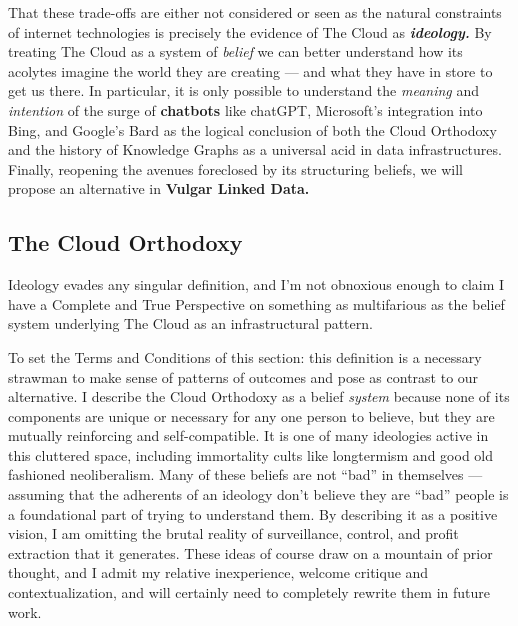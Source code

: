 That these trade-offs are either not considered or seen as the natural
constraints of internet technologies is precisely the evidence of The
Cloud as \textbf{\emph{ideology.}} By treating The Cloud as a system of
\emph{belief} we can better understand how its acolytes imagine the
world they are creating --- and what they have in store to get us there.
In particular, it is only possible to understand the \emph{meaning} and
\emph{intention} of the surge of \textbf{chatbots} like chatGPT,
Microsoft's integration into Bing, and Google's Bard as the logical
conclusion of both the Cloud Orthodoxy and the history of Knowledge
Graphs as a universal acid in data infrastructures. Finally, reopening
the avenues foreclosed by its structuring beliefs, we will propose an
alternative in \textbf{Vulgar Linked Data.}

\hypertarget{the-cloud-orthodoxy}{%
\subsection{The Cloud Orthodoxy}\label{the-cloud-orthodoxy}}

Ideology evades any singular definition, and I'm not obnoxious enough to
claim I have a Complete and True Perspective on something as
multifarious as the belief system underlying The Cloud as an
infrastructural pattern.

To set the Terms and Conditions of this section: this definition is a
necessary strawman to make sense of patterns of outcomes and pose as
contrast to our alternative. I describe the Cloud Orthodoxy as a belief
\emph{system} because none of its components are unique or necessary for
any one person to believe, but they are mutually reinforcing and
self-compatible. It is one of many ideologies active in this cluttered
space, including immortality cults like longtermism and good old
fashioned neoliberalism. Many of these beliefs are not ``bad'' in
themselves --- assuming that the adherents of an ideology don't believe
they are ``bad'' people is a foundational part of trying to understand
them. By describing it as a positive vision, I am omitting the brutal
reality of surveillance, control, and profit extraction that it
generates. These ideas of course draw on a mountain of prior
thought, and I admit my relative
inexperience, welcome critique and contextualization, and will certainly
need to completely rewrite them in future work.

